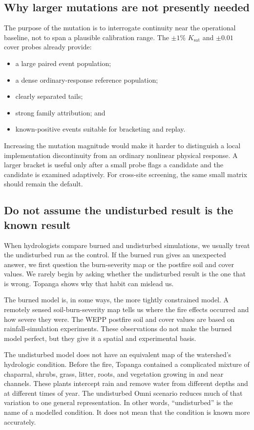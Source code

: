 \documentclass[11pt]{article}
\newcommand{\Ksat}{\ensuremath{K_{\mathrm{sat}}}}
\begin{document}
\subsection{Why larger mutations are not presently needed}

The purpose of the mutation is to interrogate continuity near the operational
baseline, not to span a plausible calibration range. The $\pm1\%$ \Ksat{} and
$\pm0.01$ cover probes already provide:

\begin{itemize}
  \item a large paired event population;
  \item a dense ordinary-response reference population;
  \item clearly separated tails;
  \item strong family attribution; and
  \item known-positive events suitable for bracketing and replay.
\end{itemize}

Increasing the mutation magnitude would make it harder to distinguish a local
implementation discontinuity from an ordinary nonlinear physical response. A
larger bracket is useful only after a small probe flags a candidate and the
candidate is examined adaptively. For cross-site screening, the same small
matrix should remain the default.

\subsection{Do not assume the undisturbed result is the known result}

When hydrologists compare burned and undisturbed simulations, we usually treat
the undisturbed run as the control. If the burned run gives an unexpected
answer, we first question the burn-severity map or the postfire soil and cover
values. We rarely begin by asking whether the undisturbed result is the one
that is wrong. Topanga shows why that habit can mislead us.

The burned model is, in some ways, the more tightly constrained model. A
remotely sensed soil-burn-severity map tells us where the fire effects occurred
and how severe they were. The WEPP postfire soil and cover values are based on
rainfall-simulation experiments. These observations do not make the burned
model perfect, but they give it a spatial and experimental basis.

The undisturbed model does not have an equivalent map of the watershed's
hydrologic condition. Before the fire, Topanga contained a complicated mixture
of chaparral, shrubs, grass, litter, roots, and vegetation growing in and near
channels. These plants intercept rain and remove water from different depths
and at different times of year. The undisturbed Omni scenario reduces much of
that variation to one general representation. In other words, ``undisturbed''
is the name of a modelled condition. It does not mean that the condition is
known more accurately.
\end{document}
